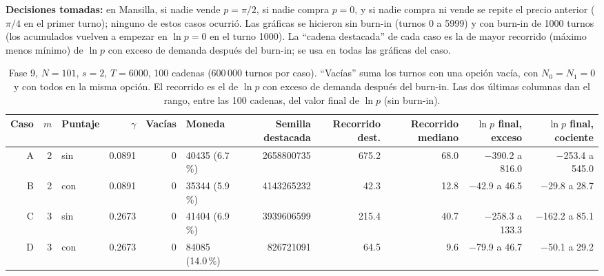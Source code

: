 \documentclass[11pt,letterpaper]{article}
\begin{document}
\textbf{Decisiones tomadas:} en Mansilla, si nadie vende $p=\pi/2$, si nadie compra $p=0$, y si nadie compra ni vende se repite el precio anterior ($\pi/4$ en el primer turno); ninguno de estos casos ocurrió. Las gráficas se hicieron sin burn-in (turnos 0 a 5999) y con burn-in de 1000 turnos (los acumulados vuelven a empezar en $\ln p=0$ en el turno 1000). La ``cadena destacada'' de cada caso es la de mayor recorrido (máximo menos mínimo) de $\ln p$ con exceso de demanda después del burn-in; se usa en todas las gráficas del caso.

\begin{table}[H]
\centering
\scriptsize
\setlength{\tabcolsep}{3.5pt}
\caption{Fase 9, $N=101$, $s=2$, $T=6000$, 100 cadenas (600\,000 turnos por caso). ``Vacías'' suma los turnos con una opción vacía, con $N_0=N_1=0$ y con todos en la misma opción. El recorrido es el de $\ln p$ con exceso de demanda después del burn-in. Las dos últimas columnas dan el rango, entre las 100 cadenas, del valor final de $\ln p$ (sin burn-in).}\label{tab:f9n101}
\begin{adjustbox}{max width=\textwidth}
\begin{tabular}{rrlrrlrrrrr}
\toprule
Caso & $m$ & Puntaje & $\gamma$ & Vacías & Moneda & Semilla destacada & Recorrido dest. & Recorrido mediano & $\ln p$ final, exceso & $\ln p$ final, cociente \\
\midrule
A & 2 & sin & 0.0891 & 0 & 40435 (6.7\,\%) & 2658800735 & 675.2 & 68.0 & $-$390.2 a 816.0 & $-$253.4 a 545.0 \\
B & 2 & con & 0.0891 & 0 & 35344 (5.9\,\%) & 4143265232 & 42.3 & 12.8 & $-$42.9 a 46.5 & $-$29.8 a 28.7 \\
C & 3 & sin & 0.2673 & 0 & 41404 (6.9\,\%) & 3939606599 & 215.4 & 40.7 & $-$258.3 a 133.3 & $-$162.2 a 85.1 \\
D & 3 & con & 0.2673 & 0 & 84085 (14.0\,\%) & 826721091 & 64.5 & 9.6 & $-$79.9 a 46.7 & $-$50.1 a 29.2 \\
\bottomrule
\end{tabular}
\end{adjustbox}
\end{table}
\end{document}
